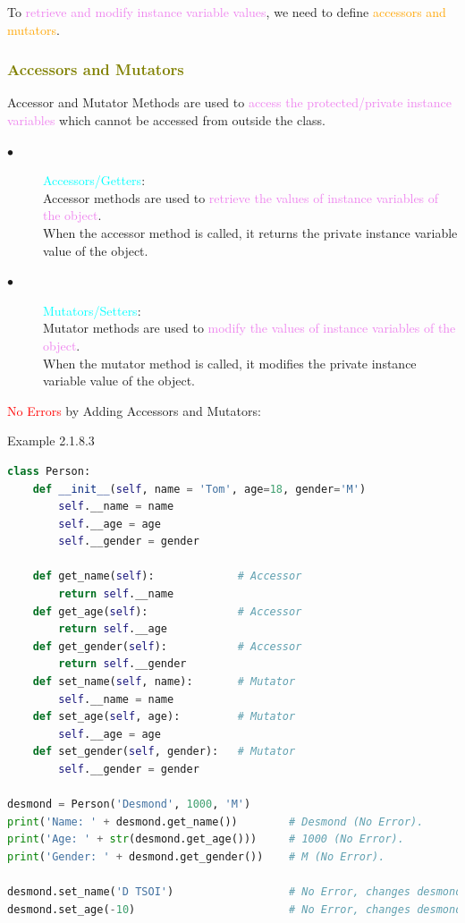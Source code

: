 \documentclass{book}
\begin{document}
    To \textcolor{violet}{retrieve and modify instance variable values}, we need to define \textcolor{orange}{accessors and mutators}.
    \newpage
    \textcolor{olive}{\subsubsection{Accessors and Mutators}}
    Accessor and Mutator Methods are used to \textcolor{violet}{access the protected/private instance variables} which cannot be accessed  from outside the class.
    \begin{description}
        \item[$\bullet$] \textcolor{cyan}{Accessors/Getters}:\\
        Accessor methods are used to \textcolor{violet}{retrieve the values of instance variables of the object}.\\
        When the accessor method is called, it returns the private instance variable value of the object.
        \item[$\bullet$] \textcolor{cyan}{Mutators/Setters}:\\
        Mutator methods are used to \textcolor{violet}{modify the values of instance variables of the object}.\\
        When the mutator method is called, it modifies the private instance variable value of the object.
    \end{description}
    \textcolor{red}{No Errors} by Adding Accessors and Mutators:
    \begin{egBox}[]{Example 2.1.8.3}{}
    \begin{lstlisting}[language=Python, basicstyle=\ttfamily\small, keywordstyle=\color{blue}, commentstyle=\color{forestgreen}, stringstyle=\color{red}, showstringspaces=false]
class Person:
    def __init__(self, name = 'Tom', age=18, gender='M')
        self.__name = name
        self.__age = age
        self.__gender = gender

    def get_name(self):             # Accessor
        return self.__name
    def get_age(self):              # Accessor
        return self.__age
    def get_gender(self):           # Accessor
        return self.__gender
    def set_name(self, name):       # Mutator
        self.__name = name
    def set_age(self, age):         # Mutator
        self.__age = age
    def set_gender(self, gender):   # Mutator
        self.__gender = gender
    
desmond = Person('Desmond', 1000, 'M')
print('Name: ' + desmond.get_name())        # Desmond (No Error).
print('Age: ' + str(desmond.get_age()))     # 1000 (No Error).
print('Gender: ' + desmond.get_gender())    # M (No Error).

desmond.set_name('D TSOI')                  # No Error, changes desmond.__name to 'D TSOI'.
desmond.set_age(-10)                        # No Error, changes desmond.__age to -10.
    \end{lstlisting}
    \end{egBox}
\end{document}
